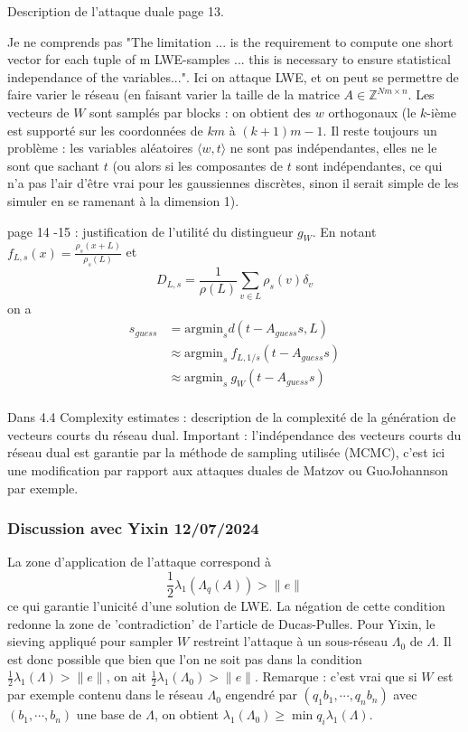 \documentclass{article}
\begin{document}
Description de l'attaque duale page 13.

Je ne comprends pas "The limitation ... is the requirement to compute one short vector for each tuple of m LWE-samples ... this is necessary to ensure statistical independance of the variables...". Ici on attaque LWE, et on peut se permettre de faire varier le réseau (en faisant varier la taille de la matrice $A\in \mathbb Z^{Nm \times n}$. Les vecteurs de $W$ sont samplés par blocks : on obtient des $w$ orthogonaux (le $k$-ième est supporté sur les coordonnées de $km$  à $(k+1) m -1$. Il reste toujours un problème : les variables aléatoires $\langle w , t \rangle $ ne sont pas indépendantes, elles ne le sont que sachant $t$ (ou alors si les composantes de $t$ sont indépendantes, ce qui n'a pas l'air d'être vrai pour les gaussiennes discrètes, sinon il serait simple de les simuler en se ramenant à la dimension 1).  

page 14 -15 : justification de l'utilité du distingueur $g_W$. En notant $f_{L,s}(x) = \frac{\rho_s(x+L)}{\rho_s(L)}$ et 
$$D_{L , s}  =\frac{1}{\rho(L)}\sum_{v\in L} \rho_s (v)\delta_v$$ 
on a 
\[\begin{split}
s_{guess} & = \text{argmin}_s d(t - A_{guess} s , L ) \\
	& \approx \text{argmin}_s \  f_{L, 1/s}(t - A_{guess} s) \\
	& \approx \text{argmin}_s \ g_W(t - A_{guess} s ) \\
\end{split}\]

Dans 4.4 Complexity estimates : description de la complexité de la génération de vecteurs courts du réseau dual. Important : l'indépendance des vecteurs courts du réseau dual est garantie par la méthode de sampling utilisée (MCMC), c'est ici une modification par rapport aux attaques duales de Matzov ou GuoJohannson par exemple.

\subsubsection{Discussion avec Yixin 12/07/2024}

La zone d'application de l'attaque correspond à \[\frac{1}{2}\lambda_1(\Lambda_q(A)) > \|e\|\]
ce qui garantie l'unicité d'une solution de LWE. La négation de cette condition redonne la zone de 'contradiction' de l'article de Ducas-Pulles. Pour Yixin, le sieving appliqué pour sampler $W$ restreint l'attaque à un sous-réseau $\Lambda_0$ de $\Lambda$. Il est donc possible que bien que l'on ne soit pas dans la condition $\frac{1}{2}\lambda_1(\Lambda) > \|e\|$, on ait
$\frac{1}{2}\lambda_1(\Lambda_0) > \|e\|$. Remarque : c'est vrai que si $W$ est par exemple contenu dans le réseau $\Lambda_0$ engendré par $(q_1 b_1,\cdots , q_n b_n )$ avec $(b_1,\cdots , b_n )$ une base de $\Lambda$, on obtient $\lambda_1(\Lambda_0) \geq \min q_i \lambda_1(\Lambda)$.
\end{document}
